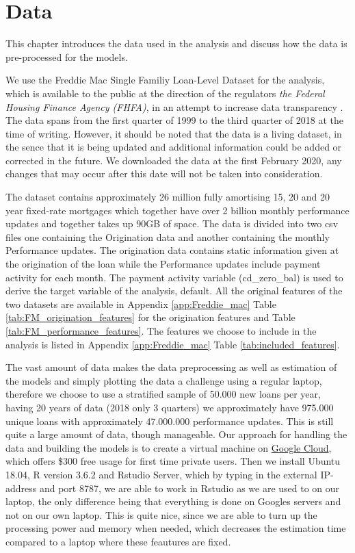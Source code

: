 \chapter{Data}\label{ch:2}
This chapter introduces the data used in the analysis and discuss how the data is pre-processed for the models. 

We use the Freddie Mac Single Familiy Loan-Level Dataset for the analysis, which is available to the public at the direction of the regulators \textit{the Federal Housing Finance Agency (FHFA)}, in an attempt to increase data transparency \cite[p. 3]{Freddie_mac_guide}. The data spans from the first quarter of 1999 to the third quarter of 2018 at the time of writing. However, it should be noted that the data is a living dataset, in the sence that it is being updated and additional information could be added or corrected in the future. We downloaded the data at the first February 2020, any changes that may occur after this date will not be taken into consideration. 

The dataset contains approximately 26 million  fully amortising 15, 20 and 20 year fixed-rate mortgages which together have over 2 billion monthly performance updates and together takes up 90GB of space. The data is divided into two csv files one containing the Origination data and another containing the monthly Performance updates. The origination data contains static information given at the origination of the loan while the Performance updates include payment activity for each month. The payment activity variable (cd\_zero\_bal) is used to derive the target variable of the analysis, default. All the original features of the two datasets are available in Appendix \ref{app:Freddie_mac} Table \vref{tab:FM_origination_features} for the origination features and Table \vref{tab:FM_performance_features}. The features we choose to include in the analysis is listed in Appendix \ref{app:Freddie_mac} Table \vref{tab:included_features}.

The vast amount of data makes the data preprocessing as well as estimation of the models and simply plotting the data a challenge using a regular laptop, therefore we choose to use a stratified sample of 50.000 new loans per year, having 20 years of data (2018 only 3 quarters) we approximately have 975.000 unique loans with approximately 47.000.000 performance updates. This is still quite a large amount of data, though manageable.  
Our approach for handling the data and building the models is to create a virtual machine on \href{https://cloud.google.com/}{Google Cloud}, which offers \$300 free usage for first time private users. Then we install Ubuntu 18.04, R version 3.6.2 and Rstudio Server, which by typing in the external IP-address and port 8787, we are able to work in Rstudio as we are used to on our laptop, the only difference being that everything is done on Googles servers and not on our own laptop. This is quite nice, since we are able to turn up the processing power and memory when needed, which decreases the estimation time compared to a laptop where these feautures are fixed.

